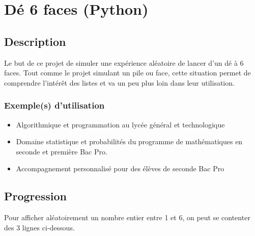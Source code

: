 \documentclass[letterpaper,10pt,french]{sphinxmanual}
\begin{document}
\section{Dé 6 faces (Python)}
\label{\detokenize{decouverte/de6faces-python::doc}}\label{\detokenize{decouverte/de6faces-python:pythonde6faces}}\label{\detokenize{decouverte/de6faces-python:de-6-faces-python}}

\subsection{Description}
\label{\detokenize{decouverte/de6faces-python:description}}
Le but de ce projet de simuler une expérience aléatoire de lancer d’un dé à 6 faces.
Tout comme le projet simulant un pile ou face, cette situation permet de comprendre
l’intérêt des listes et va un peu plus loin dans leur utilisation.


\subsubsection{Exemple(s) d’utilisation}
\label{\detokenize{decouverte/de6faces-python:exemple-s-d-utilisation}}\begin{itemize}
\item {} 
Algorithmique et programmation au lycée général et technologique

\item {} 
Domaine statistique et probabilités du programme de mathématiques en seconde et première Bac Pro.

\item {} 
Accompagnement personnalisé pour des élèves de seconde Bac Pro

\end{itemize}


\subsection{Progression}
\label{\detokenize{decouverte/de6faces-python:progression}}
Pour afficher aléatoirement un nombre entier entre 1 et 6,
on peut se contenter des 3 lignes ci-dessous.

%
\begin{sphinxVerbatim}[commandchars=\\\{\}]
 
    
       
\end{sphinxVerbatim}
\end{document}
